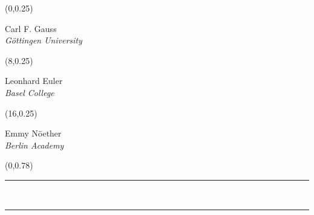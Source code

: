 \documentclass[a0]{a0poster}
\theoremstyle{definition}
\newcommand\doubleline{\hrule\ \vspace{-10pt} \hrule}
\begin{document}
\newcommand{\firstauthor}{Carl F. Gauss}
\newcommand{\firstauthoruni}{G\"ottingen University}
\newcommand{\firstauthoremail}{gauss@msri.org}
\newcommand{\secondauthor}{Leonhard Euler}
\newcommand{\secondauthoruni}{Basel College}
\newcommand{\secondauthoremail}{euler@basel.edu}
\newcommand{\thirdauthor}{Emmy N\"oether}
\newcommand{\thirdauthoruni}{Berlin Academy}
\newcommand{\thirdauthoremail}{noether@berlin.de}
\begin{textblock}{7}(0,0.25)
\begin{center}
{\color{DarkBlue}\LARGE
\firstauthor}\\
{\color{DarkBlue}\Large{\it \firstauthoruni}}
\end{center}
\end{textblock}
\begin{textblock}{7}(8,0.25)
\begin{center}
{\color{DarkBlue}\LARGE
\secondauthor}\\
{\color{DarkBlue}\Large{\it \secondauthoruni}}
\end{center}
\end{textblock}
\begin{textblock}{7}(16,0.25)
\begin{center}
{\color{DarkBlue}\LARGE
\thirdauthor}\\
{\color{DarkBlue}\Large{\it \thirdauthoruni}}
\end{center}
\end{textblock}
\begin{textblock}{23}(0,0.78)
\begin{center}
\smallskip
\doubleline
\end{center}
\end{textblock}
\end{document}
